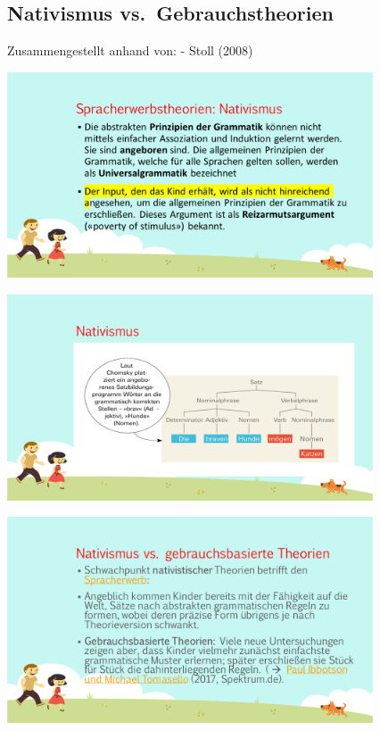 \documentclass[
  letterpaper,
]{scrbook}
\begin{document}
\hypertarget{nativismus-vs.-gebrauchstheorien}{%
\subsection{Nativismus
vs.~Gebrauchstheorien}\label{nativismus-vs.-gebrauchstheorien}}

Zusammengestellt anhand von: - Stoll (2008)

\includegraphics[width=4.27in,height=\textheight]{./pictures/muster_intentionen/Diapozitiv2.PNG}

\includegraphics[width=4.27in,height=\textheight]{./pictures/muster_intentionen/Diapozitiv3.PNG}

\includegraphics[width=4.27in,height=\textheight]{./pictures/muster_intentionen/Diapozitiv4.PNG}
\end{document}
